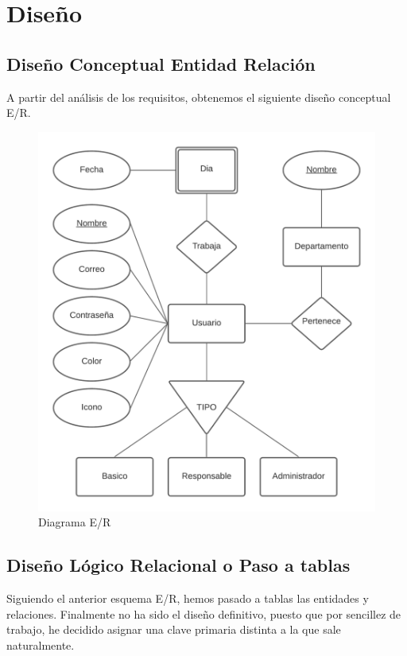 \documentclass[11pt,spanish,listoffigures,listoftables]{tfgetsinf}
\begin{document}
\chapter{Diseño}

\section{Diseño Conceptual Entidad Relación}
A partir del análisis de los requisitos, obtenemos el siguiente diseño conceptual E/R.

\begin{figure}[h!] %
  \centering
   \includegraphics[scale=0.80]{img/EntidadRelacion.png}
   \caption{Diagrama E/R}
   \label{fig:diagramaer}
 \end{figure}

\section{Diseño Lógico Relacional o Paso a tablas}
Siguiendo el anterior esquema E/R, hemos pasado a tablas las entidades y relaciones.
Finalmente no ha sido el diseño definitivo, puesto que por sencillez de trabajo, he decidido asignar una clave primaria distinta a la que sale naturalmente.
\end{document}
